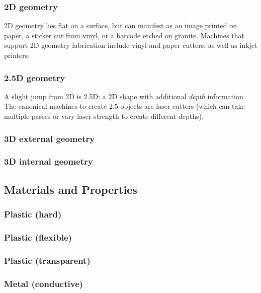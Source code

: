 \subsubsection{2D geometry}

2D geometry lies flat on a surface, but can manifest as an image printed on paper, a sticker cut from vinyl, or a barcode etched on granite. Machines that support 2D geometry fabrication include vinyl and paper cutters, as well as inkjet printers.

\subsubsection{2.5D geometry}

A slight jump from 2D is 2.5D: a 2D shape with additional \emph{depth} information. The canonical machines to create 2.5 objects are laser cutters (which can take multiple passes or vary laser strength to create different depths).

\subsubsection{3D external geometry}

\subsubsection{3D internal geometry}

\subsection{Materials and Properties}

\subsubsection{Plastic (hard)}

\subsubsection{Plastic (flexible)}

\subsubsection{Plastic (transparent)}

\subsubsection{Metal (conductive)}

